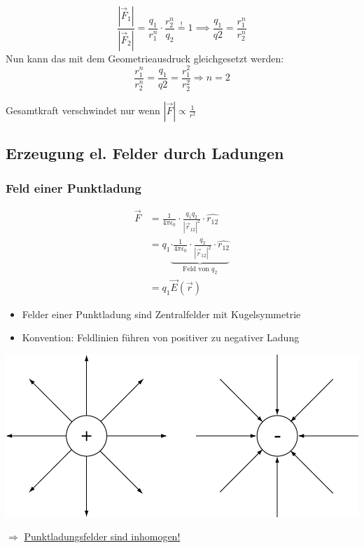 \documentclass[11pt]{article}
\begin{document}
$$\frac{|\vec{F}_1|}{|\vec{F}_2|} = \frac{q_1}{r_1^n}\cdot \frac{r_2^n}{q_2} \overset{!}{=} 1 \implies \frac{q_1}{q2}=\frac{r_1^n}{r_2^n}$$
Nun kann das mit dem Geometrieausdruck gleichgesetzt werden:
$$\frac{r_1^n}{r_2^n}=\frac{q_1}{q2}=\frac{r_1^2}{r_2^2}\Rightarrow n=2$$

Gesamtkraft verschwindet nur wenn $|\vec{F}| \propto \frac{1}{r^2}$

\subsection{Erzeugung el. Felder durch Ladungen}

	\subsubsection{Feld einer Punktladung}
	
	\begin{align*}
		\vec{F} &= \frac{1}{4\pi\epsilon_0} \cdot \frac{q_1 q_2}{ |\vec{r}_{12}|^2 } \cdot \hat{r_{12}} \\
					&=q_1 \underbrace{ \cdot \frac{1}{4\pi\epsilon_0} \cdot \frac{q_2}{ |\vec{r}_{12}|^2 } \cdot \hat{r_{12}}  }_{\text{Feld von }q_2} \\
					&=q_1 \vec{E}(\vec{r})
	\end{align*}
	\begin{itemize}
		\item Felder einer Punktladung sind Zentralfelder mit Kugelsymmetrie
		\item Konvention: Feldlinien führen von positiver zu negativer Ladung
	\end{itemize}
	\begin{center}
		\includegraphics[width=0.7\linewidth]{skizzen/14/14_4B0}
	\end{center}

	$ \Rightarrow $ \underline{Punktladungsfelder sind inhomogen!}
	
\end{document}
